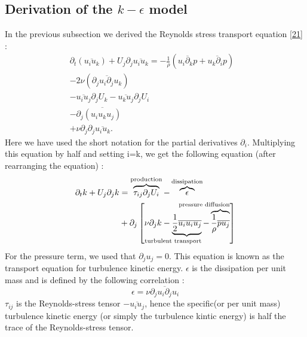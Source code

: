 \documentclass[11pt]{article}
\begin{document}
{%
\subsection{Derivation of the $k-\epsilon$ model}
In the previous subsection we derived the Reynolds stress transport equation \eqref{21} :
\begin{align*}
\partial_t (\overline{u_i u_k}) + U_j \partial_j\overline{u_i u_k} =
-\frac{1}{\rho} (\overline{u_i \partial_k p} +\overline{u_k \partial_i p} ) & 
\\ 
- 2\nu (\overline{\partial_j u_i \partial_j u_k}) & 
\\
- \overline{ u_i u_j} \partial_j U_k - \overline{ u_k u_j} \partial_j U_i
\\ 
- \partial_j\overline{ (u_i u_k u_j)} \\ 
+ \nu\partial_j \partial_j \overline{u_i u_k} .
\end{align*}
Here we have used the short notation for the partial derivatives $\partial_i$. 
Multiplying this equation by half and setting i=k, we get the following equation (after rearranging the equation) :
\begin{align*} 
\partial_t k + U_j \partial_j k &= \overbrace{\tau_{ij} \partial_j U_i}^{\text{production}}
- \overbrace{\epsilon}^{\text{dissipation}} \\
&+ \partial_j \left[ \nu \partial_j k - \underbrace{\frac{1}{2}\overline{u_i u_i u_j}}_{\hidewidth{\text{turbulent transport}}}
 -\overbrace{\frac{1}{\rho} \overline{p u_j}}^{\hidewidth{\text{pressure diffusion}}}\right]
\end{align*}
For the pressure term, we used that $\partial_j u_j= 0$. This equation is known as the 
transport equation for turbulence kinetic energy. $\epsilon$ is the dissipation per 
unit mass and is defined by the following correlation :
\begin{equation*}
\epsilon = \nu \overline{\partial_j u_i \partial_j u_i}
\end{equation*}
$\tau_{ij}$ is the Reynolds-stress tensor $-\overline{u_i u_j}$, hence the specific(or per unit mass) 
turbulence kinetic energy (or simply the turbulence kintic energy) is half the trace of the Reynolds-stress 
tensor. \\

}
\end{document}
